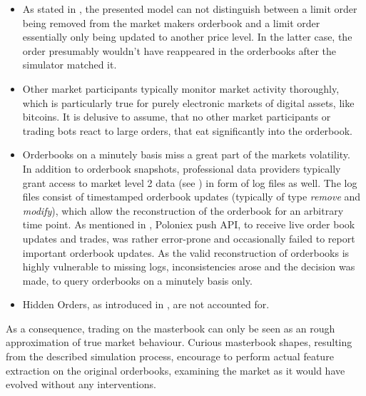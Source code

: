 \begin{itemize}
\item As stated in , the presented model can not distinguish between a limit order being removed from the market makers orderbook and a limit order essentially only being updated to another price level. In the latter case, the order presumably wouldn't have reappeared in the orderbooks after the simulator matched it.
\item Other market participants typically monitor market activity thoroughly, which is particularly true for purely electronic markets of digital assets, like bitcoins. It is delusive to assume, that no other market participants or trading bots react to large orders, that eat significantly into the orderbook.


\item Orderbooks on a minutely basis miss a great part of the markets volatility. \\
In addition to orderbook snapshots, professional data providers typically grant access to market level 2 data (see ) in form of log files as well. The log files consist of timestamped orderbook updates (typically of type \emph{remove} and \emph{modify}), which allow the reconstruction of the orderbook for an arbitrary time point. As mentioned in , Poloniex push API, to receive live order book updates and trades, was rather error-prone and occasionally failed to report important orderbook updates. As the valid reconstruction of orderbooks is highly vulnerable to missing logs, inconsistencies arose and the decision was made, to query orderbooks on a minutely basis only.
\item Hidden Orders, as introduced in , are not accounted for.
\end{itemize}

As a consequence, trading on the masterbook can only be seen as an rough approximation of true market behaviour. Curious masterbook shapes, resulting from the described simulation process, encourage to perform actual feature extraction on the original orderbooks, examining the market as it would have evolved without any interventions.







\cleardoublepage{}